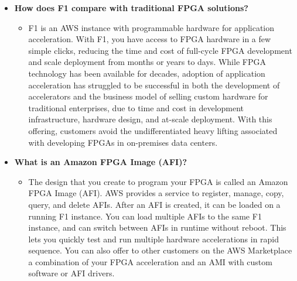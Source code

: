 \documentclass[a4paper]{article}
\begin{document}
\begin{itemize}
        \item[\ding{42}] 
        \label{How does F1 compare with traditional FPGA solutions?}
        \hypertarget{How does F1 compare with traditional FPGA solutions?}{\textbf{How does F1 compare with traditional FPGA solutions?}}
        \begin{itemize}
            \item[\ding{45}] F1 is an AWS instance with programmable hardware for application acceleration. With F1, you have access to FPGA hardware in a few simple clicks, reducing the time and cost of full-cycle FPGA development and scale deployment from months or years to days. While FPGA technology has been available for decades, adoption of application acceleration has struggled to be successful in both the development of accelerators and the business model of selling custom hardware for traditional enterprises, due to time and cost in development infrastructure, hardware design, and at-scale deployment. With this offering, customers avoid the undifferentiated heavy lifting associated with developing FPGAs in on-premises data centers.
        \end{itemize}

        \item[\ding{42}]
        \label{What is an Amazon FPGA Image (AFI)?}
        \hypertarget{What is an Amazon FPGA Image (AFI)?}{\textbf{What is an Amazon FPGA Image (AFI)?}}
        \begin{itemize}
            \item[\ding{45}] The design that you create to program your FPGA is called an Amazon FPGA Image (AFI). AWS provides a service to register, manage, copy, query, and delete AFIs. After an AFI is created, it can be loaded on a running F1 instance. You can load multiple AFIs to the same F1 instance, and can switch between AFIs in runtime without reboot. This lets you quickly test and run multiple hardware accelerations in rapid sequence. You can also offer to other customers on the AWS Marketplace a combination of your FPGA acceleration and an AMI with custom software or AFI drivers.
        \end{itemize}


\end{itemize}
\end{document}
